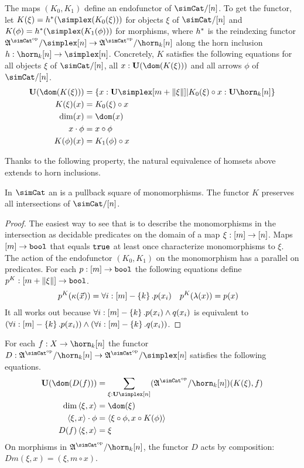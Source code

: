 \documentclass[csh.tex]{subfiles}
\begin{document}
\begin{definition}
The maps $(K_0,K_1)$ define an endofunctor of $\simCat/[n]$. To get the functor, let $K(\xi) = h\ri(\simplex(K_0(\xi)))$ for objects $\xi$ of $\simCat/[n]$ and $K(\phi) = h\ri(\simplex(K_1(\phi)))$ for morphisms, where $h^*$ is the reindexing functor $\ambient\s/\simplex[n]\to\ambient\s/\horn_k[n]$ along the horn inclusion $h\of \horn_k[n]\to\simplex[n]$. Concretely, $K$ satisfies the following equations for all objects $\xi$ of $\simCat/[n]$, all $x\of \base(\dom(K(\xi)))$ and all arrows $\phi$ of $\simCat/[n]$.
\begin{align*}
\base(\dom(K(\xi))) &= \set{ x\of\base\simplex[m+\norm\xi]| K_0(\xi)\circ x\of\base\horn_k[n]}\\
K(\xi)(x) &= K_0(\xi)\circ x \\
\dim(x) &= \dom(x) \\
x\cdot\phi &= x\circ\phi \\
K(\phi)(x) &= K_1(\phi)\circ x
\end{align*}
\end{definition}

Thanks to the following property, the natural equivalence of homsets above extends to horn inclusions.

\begin{lemma} In $\simCat$ an  is a pullback square of monomorphisms. The functor $K$ preserves all intersections of $\simCat/[n]$. \end{lemma}

\begin{proof} The easiest way to see that is to describe the monomorphisms in the intersection as decidable predicates on the domain of a map $\xi:[m]\to[n]$. Maps $[m]\to\mathtt{bool}$ that equals $\mathtt{true}$ at least once characterize monomorphisms to $\xi$. The action of the endofunctor $(K_0,K_1)$ on the monomorphism has a parallel on predicates. For each $p:[m]\to\mathtt{bool}$ the following equations define $p^K: [m+\Vert \xi \Vert]\to\mathtt{bool}$. 
\begin{align*}
p^K(\kappa(\vec x)) &= \forall i:[m]-\left\{k\right\}.p(x_i) &
p^K(\lambda(x)) &= p(x)
\end{align*}
It all works out because $\forall i:[m]-\left\{k\right\}.p(x_i)\land q(x_i)$ is equivalent to $(\forall i:[m]-\left\{k\right\}.p(x_i))\land(\forall i:[m]-\left\{k\right\}.q(x_i))$.
\end{proof}

\begin{definition}
For each $f\of X\to\horn_k[n]$ the functor $D\of \ambient\s/\horn_k[n]\to\ambient\s/\simplex[n]$ satisfies the following equations.
\begin{align*}
\base(\dom(D(f))) &= \sum_{\xi\of\base\simplex[n]}(\ambient\s/\horn_k[n])(K(\xi),f)\\
\dim\tuplet{\xi,x} &= \dom(\xi)\\
\tuplet{\xi,x}\cdot\phi &= \tuplet{\xi\circ\phi,x\circ K(\phi)}\\
D(f)\tuplet{\xi,x} &= \xi
\end{align*}
On morphisms in $\ambient\s/\horn_k[n]$, the functor $D$ acts by composition: $Dm(\xi,x) = (\xi,m\circ x)$. \label{descent functor}
\end{definition}
\end{document}
